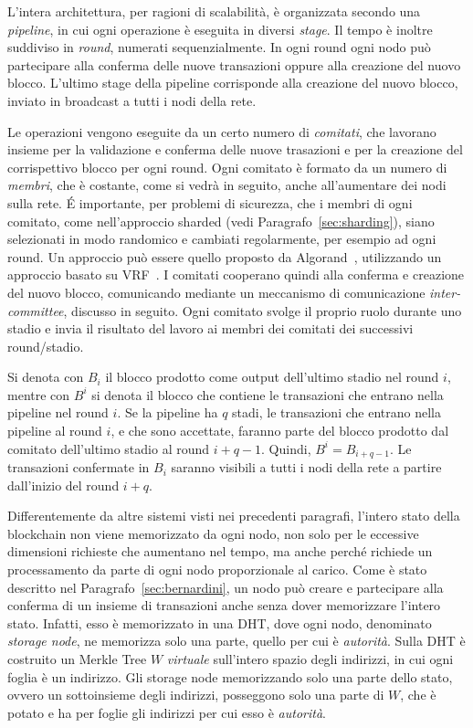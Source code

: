 L'intera architettura, per ragioni di scalabilità, è organizzata secondo una \emph{pipeline}, in cui ogni operazione è eseguita in diversi \emph{stage}. Il tempo è inoltre suddiviso in \emph{round}, numerati sequenzialmente. In ogni round ogni nodo può partecipare alla conferma delle nuove transazioni oppure alla creazione del nuovo blocco. L'ultimo stage della pipeline corrisponde alla creazione del nuovo blocco, inviato in broadcast a tutti i nodi della rete.

Le operazioni vengono eseguite da un certo numero di \emph{comitati}, che lavorano insieme per la validazione e conferma delle nuove trasazioni e per la creazione del corrispettivo blocco per ogni round. Ogni comitato è formato da un numero di \emph{membri}, che è costante, come si vedrà in seguito, anche all'aumentare dei nodi sulla rete. \'E importante, per problemi di sicurezza, che i membri di ogni comitato, come nell'approccio sharded (vedi Paragrafo~\ref{sec:sharding}), siano selezionati in modo randomico e cambiati regolarmente, per esempio ad ogni round. Un approccio può essere quello proposto da Algorand~\cite{gilad2017algorand}, utilizzando un approccio basato su VRF~\cite{micali1999verifiable}. I comitati cooperano quindi alla conferma e creazione del nuovo blocco, comunicando mediante un meccanismo di comunicazione \emph{inter-committee}, discusso in seguito.
Ogni comitato svolge il proprio ruolo durante uno stadio e invia il risultato del lavoro ai membri dei comitati dei successivi round/stadio.

Si denota con $B_i$ il blocco prodotto come output dell'ultimo stadio nel round $i$, mentre con $B^i$ si denota il blocco che contiene le transazioni che entrano nella pipeline nel round $i$. Se la pipeline ha $q$ stadi, le transazioni che entrano nella pipeline al round $i$, e che sono accettate, faranno parte del blocco prodotto dal comitato dell'ultimo stadio al round $i+q-1$. Quindi, $B^i = B_{i+q-1}$. Le transazioni confermate in $B_i$ saranno visibili a tutti i nodi della rete a partire dall'inizio del round $i+q$.

Differentemente da altre sistemi visti nei precedenti paragrafi, l'intero stato della blockchain non viene memorizzato da ogni nodo, non solo per le eccessive dimensioni richieste che aumentano nel tempo, ma anche perché richiede un processamento da parte di ogni nodo proporzionale al carico. Come è stato descritto nel Paragrafo~\ref{sec:bernardini}, un nodo può creare e partecipare alla conferma di un insieme di transazioni anche senza dover memorizzare l'intero stato. Infatti, esso è memorizzato in una DHT, dove ogni nodo, denominato \emph{storage node}, ne memorizza solo una parte, quello per cui è \emph{autorità}. Sulla DHT è costruito un Merkle Tree $W$ \emph{virtuale} sull'intero spazio degli indirizzi, in cui ogni foglia è un indirizzo. Gli storage node memorizzando solo una parte dello stato, ovvero un sottoinsieme degli indirizzi, posseggono solo una parte di $W$, che è potato e ha per foglie gli indirizzi per cui esso è \emph{autorità}.

